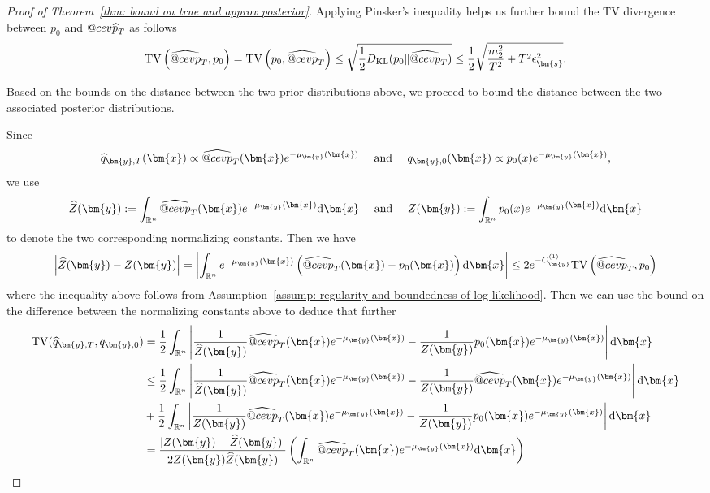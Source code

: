 \documentclass{article}
\makeatletter
\numberwithin{equation}{section}
\newcommand{\dif}{{\mathrm{d}}}
\def\vs{{\bm{s}}}
\def\vx{{\bm{x}}}
\def\vy{{\bm{y}}}
\newcommand{\KL}{D_{\mathrm{KL}}}
\newcommand{\TV}{\mathrm{TV}}
\DeclareRobustCommand{\cev}[1]{%
  {\mathpalette\do@cev{#1}}%
}
\newcommand{\do@cev}[2]{%
  \vbox{\offinterlineskip
    \sbox\z@{$\m@th#1 x$}%
    \ialign{##\cr
      \hidewidth\reflectbox{$\m@th#1\vec{}\mkern4mu$}\hidewidth\cr
      \noalign{\kern-\ht\z@}
      $\m@th#1#2$\cr
    }%
  }%
}
\makeatother
\begin{document}
\begin{proof}[Proof of Theorem~\ref{thm: bound on true and approx posterior}]
Applying Pinsker's inequality helps us further bound the TV divergence between $p_0$ and $\cev{\widehat{p}}_T$ as follows
\begin{equation}
\label{eqn: bound on TV between prior dist}
\TV\left(\widehat{\cev{p}}_T,p_0\right)=\TV\left(p_0,\widehat{\cev{p}}_T\right) \leq \sqrt{\frac{1}{2}\KL(p_0 \| \widehat{\cev{p}}_T)} \leq \frac{1}{2}\sqrt{\frac{m_2^2}{T^2} + T^2\epsilon_{\vs}^2}.
\end{equation}

Based on the bounds on the distance between the two prior distributions above, we proceed to bound the distance between the two associated posterior distributions. 

Since $$\widehat{q}_{\vy,T}(\vx) \propto \widehat{\cev{p}}_T(\vx)e^{-\mu_{\vy}(\vx)} \quad \text{ and } \quad q_{\vy,0}(\vx) \propto p_0(x)e^{-\mu_{\vy}(\vx)},$$ 
we use $$\widehat{Z}(\vy) := \int_{\mathbb{R}^n}\widehat{\cev{p}}_T(\vx)e^{-\mu_{\vy}(\vx)}\dif \vx \quad \text{ and } \quad Z(\vy) := \int_{\mathbb{R}^n}p_0(x)e^{-\mu_{\vy}(\vx)}\dif\vx$$ to denote the two corresponding normalizing constants. Then we have
\begin{equation}
\label{eqn: bound on difference of normalizing constants}
\left|\widehat{Z}(\vy) -Z(\vy)\right| = \left|\int_{\mathbb{R}^n}e^{-\mu_{\vy}(\vx)}\left(\widehat{\cev{p}}_T(\vx) - p_0(\vx)\right)\dif\vx\right| \leq 2e^{-C^{(1)}_{\vy}}\TV\left(\widehat{\cev{p}}_T,p_0\right)    
\end{equation}
where the inequality above follows from Assumption~\ref{assump: regularity and boundedness of log-likelihood}. Then we can use the bound on the difference between the normalizing constants above to deduce that further
\begin{equation*}
\begin{aligned}
\TV(\widehat{q}_{\vy,T},q_{\vy,0}) &= \frac{1}{2}\int_{\mathbb{R}^n}\left|\frac{1}{\widehat{Z}(\vy)}\widehat{\cev{p}}_T(\vx)e^{-\mu_{\vy}(\vx)} - \frac{1}{Z(\vy)}p_0(\vx)e^{-\mu_{\vy}(\vx)}\right|\dif\vx \\
&\leq \frac{1}{2}\int_{\mathbb{R}^n}\left|\frac{1}{\widehat{Z}(\vy)}\widehat{\cev{p}}_T(\vx)e^{-\mu_{\vy}(\vx)} - \frac{1}{Z(\vy)}\widehat{\cev{p}}_T(\vx)e^{-\mu_{\vy}(\vx)}\right|\dif\vx \\
&+ \frac{1}{2}\int_{\mathbb{R}^n}\left|\frac{1}{Z(\vy)}\widehat{\cev{p}}_T(\vx)e^{-\mu_{\vy}(\vx)} - \frac{1}{Z(\vy)}p_0(\vx)e^{-\mu_{\vy}(\vx)}\right|\dif\vx \\
&= \frac{|Z(\vy)-\widehat{Z}(\vy)|}{2Z(\vy)\widehat{Z}(\vy)}\left(\int_{\mathbb{R}^n}\widehat{\cev{p}}_T(\vx)e^{-\mu_{\vy}(\vx)}\dif\vx\right) \\

\end{aligned}
\end{equation*}
\end{proof}
\end{document}
